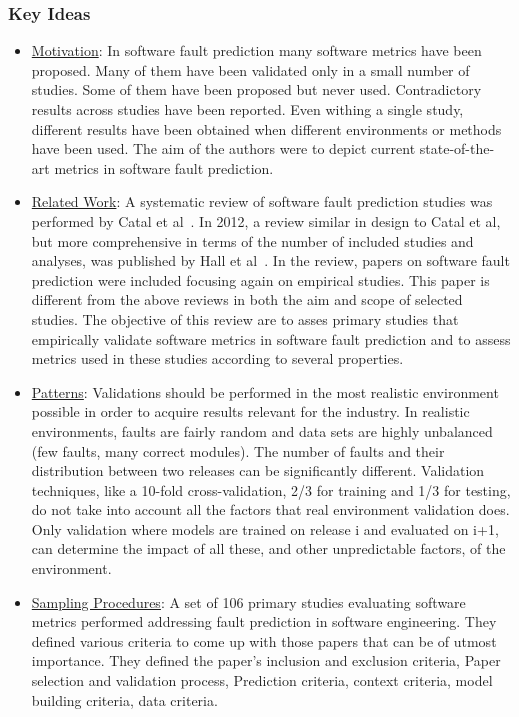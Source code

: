\documentclass[conference]{IEEEtran}
\begin{document}
\subsubsection{\textbf{Key Ideas}}
\begin{itemize}
    \item \underline{Motivation}: In software fault prediction many software metrics have been proposed. Many of them have been validated only in a small number of studies. Some of them have been proposed but never used. Contradictory results across studies have been reported. Even withing a single study, different results have been obtained when different environments or methods have been used. The aim of the authors were to depict current state-of-the-art metrics in software fault prediction.
    \item \underline{Related Work}: A systematic review of software fault prediction studies was performed by Catal et al~\cite{catal2009systematic}. In 2012, a review similar in design to Catal et al, but more comprehensive in terms of the number of included studies and analyses, was published by Hall et al~\cite{hall2012systematic}. In the review, papers on software fault prediction were included focusing again on empirical studies. This paper is different from the above reviews in both the aim and scope of selected  studies. The objective of this review are to asses primary studies that empirically validate software metrics in software fault prediction and to assess metrics used in these studies according to several properties.
    \item \underline{Patterns}: Validations should be performed in the most realistic environment possible in order to acquire results relevant for the industry. In realistic environments, faults are fairly random and data sets are highly unbalanced (few faults, many correct modules). The number of faults and their distribution between two releases can be significantly different. Validation techniques, like a 10-fold cross-validation, 2/3 for training and 1/3 for testing, do not take into account all the factors that real environment validation does. Only validation where models are trained on release i and evaluated on i+1, can determine the impact of all these, and other unpredictable factors, of the environment.
    \item \underline{Sampling Procedures}: A set of 106 primary studies evaluating software metrics performed addressing fault prediction in software engineering. They defined various criteria to come up with those papers that can be of utmost importance. They defined the paper's inclusion and exclusion criteria, Paper selection and validation process, Prediction criteria, context criteria, model building criteria, data criteria.
\end{itemize}
\end{document}
